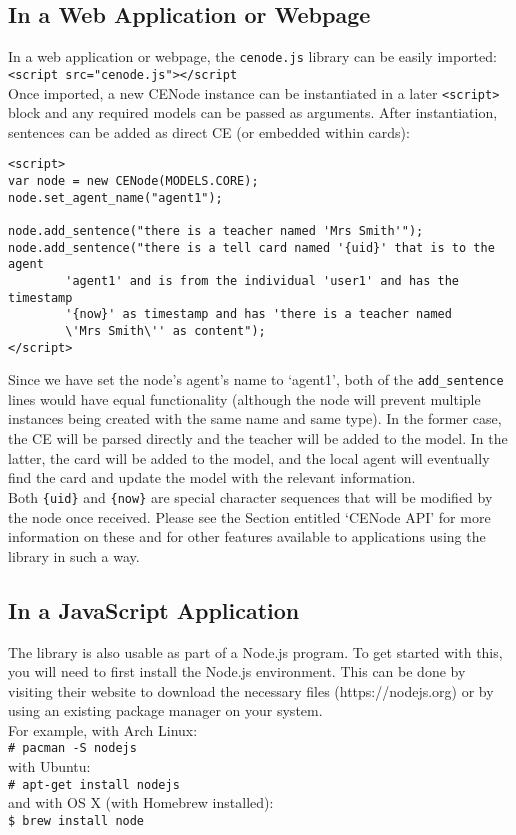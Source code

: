 \documentclass{article}
\begin{document}
\subsection{In a Web Application or Webpage}
\label{as_a_webapp}
In a web application or webpage, the \texttt{cenode.js} library can be easily imported:\\
\texttt{<script src="cenode.js"></script}\\

Once imported, a new CENode instance can be instantiated in a later \texttt{<script>} block and any required models can be passed as arguments. After instantiation, sentences can be added as direct CE (or embedded within cards):
\begin{verbatim}
<script>
var node = new CENode(MODELS.CORE);
node.set_agent_name("agent1");

node.add_sentence("there is a teacher named 'Mrs Smith'");
node.add_sentence("there is a tell card named '{uid}' that is to the agent 
        'agent1' and is from the individual 'user1' and has the timestamp 
        '{now}' as timestamp and has 'there is a teacher named 
        \'Mrs Smith\'' as content");
</script>
\end{verbatim}

Since we have set the node's agent's name to `agent1', both of the \texttt{add\_sentence} lines would have equal functionality (although the node will prevent multiple instances being created with the same name and same type). In the former case, the CE will be parsed directly and the teacher will be added to the model. In the latter, the card will be added to the model, and the local agent will eventually find the card and update the model with the relevant information.\\

Both \texttt{\{uid\}} and \texttt{\{now\}} are special character sequences that will be modified by the node once received. Please see the Section entitled `CENode API' for more information on these and for other features available to applications using the library in such a way.

\subsection{In a JavaScript Application}
\label{as_an_app}
The library is also usable as part of a Node.js program. To get started with this, you will need to first install the Node.js environment. This can be done by visiting their website to download the necessary files (https://nodejs.org) or by using an existing package manager on your system.\\
For example, with Arch Linux:\\
\texttt{\# pacman -S nodejs}\\
with Ubuntu:\\
\texttt{\# apt-get install nodejs}\\
and with OS X (with Homebrew installed):\\
\texttt{\$ brew install node}\\
\end{document}

